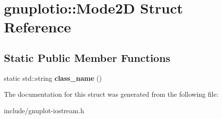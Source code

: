 \hypertarget{structgnuplotio_1_1Mode2D}{}\section{gnuplotio\+:\+:Mode2D Struct Reference}
\label{structgnuplotio_1_1Mode2D}
\subsection*{Static Public Member Functions}
\begin{DoxyCompactItemize}
\item 
\mbox{\label{structgnuplotio_1_1Mode2D_aaf35c9cd117de8bc5dbc2d5ec1224232}} 
static std\+::string {\bfseries class\+\_\+name} ()
\end{DoxyCompactItemize}


The documentation for this struct was generated from the following file\+:\begin{DoxyCompactItemize}
\item 
include/gnuplot-\/iostream.\+h\end{DoxyCompactItemize}
